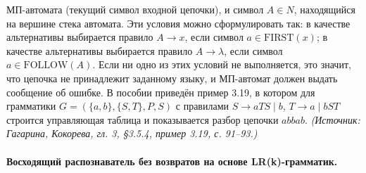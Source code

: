 \documentclass[a4paper,12pt]{article}
\begin{document}
МП-автомата (текущий символ входной цепочки), и символ \(A\in N\), находящийся на вершине стека автомата. Эти условия можно сформулировать так: в качестве альтернативы выбирается правило \(A\to x\), если символ \(a\in\mathrm{FIRST}(x)\); в качестве альтернативы выбирается правило \(A\to\lambda\), если символ \(a\in\mathrm{FOLLOW}(A)\). Если ни одно из этих условий не выполняется, это значит, что цепочка не принадлежит заданному языку, и МП-автомат должен выдать сообщение об ошибке. В пособии приведён пример 3.19, в котором для грамматики \(G=(\{a,b\},\{S,T\},P,S)\) с правилами \(S\to aTS\mid b\), \(T\to a\mid bST\) строится управляющая таблица и показывается разбор цепочки \(abbab\).
\textit{(Источник: Гагарина, Кокорева, гл. 3, §3.5.4, пример 3.19, с. 91--93.)}

\paragraph{Восходящий распознаватель без возвратов на основе LR(k)-грамматик.}
\end{document}
